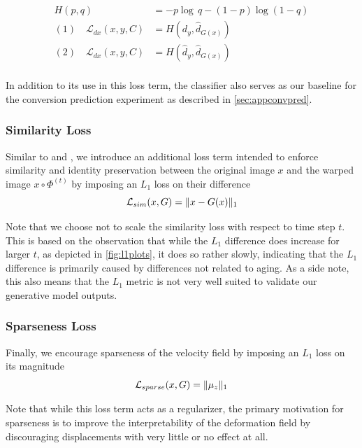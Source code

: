 \begin{equation}
	\begin{split}
		H(p, q) & = -p \log\, q - (1 - p)\log(1 - q) \\[8pt]
		(1) \quad \mathcal{L}_{dx}(x, y, C) & = 
		H(d_y, \hat d_{G(x)}) \\[8pt]
		(2) \quad \mathcal{L}_{dx}(x, y, C) & =
		H(\hat d_y, \hat d_{G(x)}) \\[8pt]
	\end{split}
\end{equation}

In addition to its use in this loss term, the classifier also serves as our baseline for the conversion prediction experiment as described in \autoref{sec:appconvpred}.

\subsubsection*{Similarity Loss}
Similar to \cite{baumgartner2018visual} and \cite{wegmayr}, we introduce an additional loss term intended to enforce similarity and identity preservation between the original image $x$ and the warped image $ x \circ \Phi^{(t)} $ by imposing an $L_1$ loss on their difference
\begin{equation}
	\mathcal{L}_{sim}( x, G ) = \lVert x - G(x) \rVert_1
\end{equation}

Note that we choose not to scale the similarity loss with respect to time step $t$. This is based on the observation that while the $L_1$ difference does increase for larger $t$, as depicted in \autoref{fig:l1plots}, it does so rather slowly, indicating that the $L_1$ difference is primarily caused by differences not related to aging. As a side note, this also means that the $L_1$ metric is not very well suited to validate our generative model outputs.

\subsubsection*{Sparseness Loss}
Finally, we encourage sparseness of the velocity field by imposing an $L_1$ loss on its magnitude
\begin{equation}
	\mathcal{L}_{sparse}( x, G ) = \lVert\mu_z\rVert_1
\end{equation}

Note that while this loss term acts as a regularizer, the primary motivation for sparseness is to improve the interpretability of the deformation field by discouraging displacements with very little or no effect at all.

